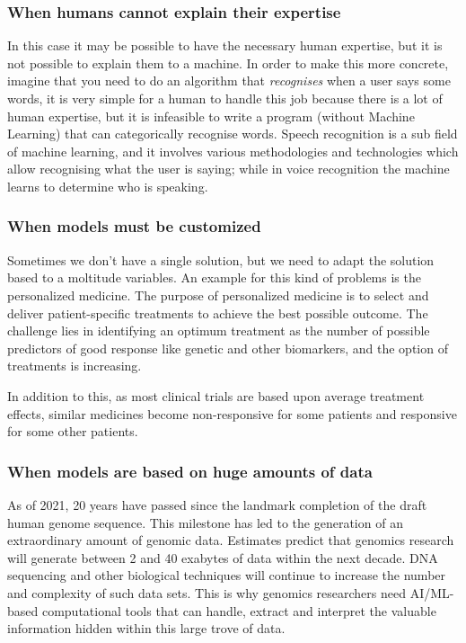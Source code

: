 \subsubsection{When humans cannot explain their expertise}
In this case it may be possible to have the necessary human expertise, but it is not possible to explain them to a machine. In order to make this more concrete, imagine that you need to do an algorithm that \emph{recognises} when a user says some words, it is very simple for a human to handle this job because there is a lot of human expertise, but it is infeasible to write a program (without Machine Learning) that can categorically recognise words. Speech recognition is a sub field of machine learning, and it involves various methodologies and technologies which allow recognising what the user is saying; while in voice recognition the machine learns to determine who is speaking.

\subsubsection{When models must be customized}
Sometimes we don't have a single solution, but we need to adapt the solution based to a moltitude variables. An example for this kind of problems is the personalized medicine. The purpose of personalized medicine is to select and deliver patient-specific treatments to achieve the best possible outcome. The challenge lies in identifying an optimum treatment as the number of possible predictors of good response like genetic and other biomarkers, and the option of treatments is increasing.

In addition to this, as most clinical trials are based upon average treatment effects, similar medicines become non-responsive for some patients and responsive for some other patients.

\subsubsection{When models are based on huge amounts of data}
As of 2021, 20 years have passed since the landmark completion of the draft human genome sequence. This milestone has led to the generation of an extraordinary amount of genomic data. Estimates predict that genomics research will generate between 2 and 40 exabytes of data within the next decade. DNA sequencing and other biological techniques will continue to increase the number and complexity of such data sets. This is why genomics researchers need AI/ML-based computational tools that can handle, extract and interpret the valuable information hidden within this large trove of data.

